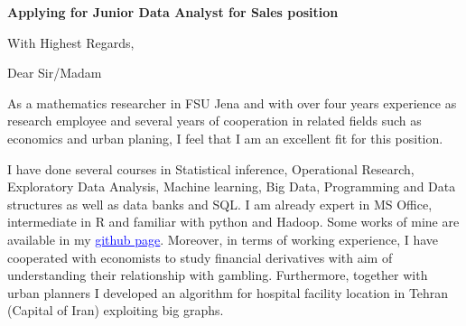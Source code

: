 \documentclass[12pt,a4paper,sans]{moderncv}        %
\title{}                               %
\begin{document}
\date{May 17, 2016}
\opening{\textbf{Applying for  Junior Data Analyst for Sales position}}
\closing{With Highest Regards,}
\makelettertitle

Dear Sir/Madam

As a mathematics researcher in FSU Jena and with over four years experience as research employee and several years of cooperation in related fields such as economics and urban planing, I feel that I am an excellent fit for this position.



I have done several courses in Statistical inference, Operational Research, Exploratory Data Analysis,  Machine learning, Big Data, Programming and Data structures as well as data banks and SQL. I am already expert in MS Office, intermediate in R and familiar with python and Hadoop. Some works of mine are available in my  \href{https://github.com/srhumir}{\textcolor{blue}{\underline{github page}}}.
Moreover, in terms of working experience, I have cooperated with economists to study financial derivatives with aim of understanding their relationship with gambling. Furthermore, together with urban planners I developed an algorithm for hospital facility location in Tehran (Capital of Iran) exploiting big graphs.





\end{document}
